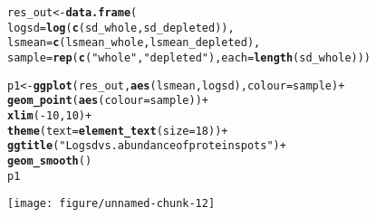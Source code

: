 \documentclass{article}\usepackage[]{graphicx}\usepackage[]{color}
\makeatletter
\def\maxwidth{ %
  \ifdim\Gin@nat@width>\linewidth
    \linewidth
  \else
    \Gin@nat@width
  \fi
}
\newcommand{\hlnum}[1]{\textcolor[rgb]{0.686,0.059,0.569}{#1}}%
\newcommand{\hlstr}[1]{\textcolor[rgb]{0.192,0.494,0.8}{#1}}%
\newcommand{\hlopt}[1]{\textcolor[rgb]{0,0,0}{#1}}%
\newcommand{\hlstd}[1]{\textcolor[rgb]{0.345,0.345,0.345}{#1}}%
\newcommand{\hlkwb}[1]{\textcolor[rgb]{0.69,0.353,0.396}{#1}}%
\newcommand{\hlkwc}[1]{\textcolor[rgb]{0.333,0.667,0.333}{#1}}%
\newcommand{\hlkwd}[1]{\textcolor[rgb]{0.737,0.353,0.396}{\textbf{#1}}}%
\newenvironment{kframe}{%
 \def\at@end@of@kframe{}%
 \ifinner\ifhmode%
  \def\at@end@of@kframe{\end{minipage}}%
  \begin{minipage}{\columnwidth}%
 \fi\fi%
 \def\FrameCommand##1{\hskip\@totalleftmargin \hskip-\fboxsep
 \colorbox{shadecolor}{##1}\hskip-\fboxsep
     \hskip-\linewidth \hskip-\@totalleftmargin \hskip\columnwidth}%
 \MakeFramed {\advance\hsize-\width
   \@totalleftmargin\z@ \linewidth\hsize
   \@setminipage}}%
 {\par\unskip\endMakeFramed%
 \at@end@of@kframe}
\newenvironment{knitrout}{}{} %
\makeatother
\begin{document}
\begin{knitrout}
\color{fgcolor}\begin{kframe}
\begin{alltt}
\hlstd{res_out} \hlkwb{<-} \hlkwd{data.frame}\hlstd{(}
  \hlkwc{logsd} \hlstd{=} \hlkwd{log}\hlstd{(}\hlkwd{c}\hlstd{(sd_whole, sd_depleted)),}
  \hlkwc{lsmean} \hlstd{=} \hlkwd{c}\hlstd{(lsmean_whole,lsmean_depleted),}
  \hlkwc{sample} \hlstd{=} \hlkwd{rep}\hlstd{(}\hlkwd{c}\hlstd{(}\hlstr{"whole"}\hlstd{,} \hlstr{"depleted"}\hlstd{),} \hlkwc{each} \hlstd{=} \hlkwd{length}\hlstd{(sd_whole)))}


\hlstd{p1} \hlkwb{<-} \hlkwd{ggplot}\hlstd{(res_out,} \hlkwd{aes}\hlstd{(lsmean, logsd),} \hlkwc{colour} \hlstd{= sample)} \hlopt{+}
  \hlkwd{geom_point}\hlstd{(}\hlkwd{aes}\hlstd{(}\hlkwc{colour} \hlstd{= sample))} \hlopt{+}
  \hlkwd{xlim}\hlstd{(}\hlopt{-}\hlnum{10}\hlstd{,} \hlnum{10}\hlstd{)}\hlopt{+}
  \hlkwd{theme}\hlstd{(}\hlkwc{text} \hlstd{=} \hlkwd{element_text}\hlstd{(}\hlkwc{size}\hlstd{=}\hlnum{18}\hlstd{))}\hlopt{+}
  \hlkwd{ggtitle}\hlstd{(}\hlstr{"Logsd vs. abundance of protein spots"}\hlstd{)} \hlopt{+}
  \hlkwd{geom_smooth}\hlstd{()}
\hlstd{p1}
\end{alltt}
\end{kframe}
\texttt{[image: figure/unnamed-chunk-12]} 

\end{knitrout}
\end{document}
